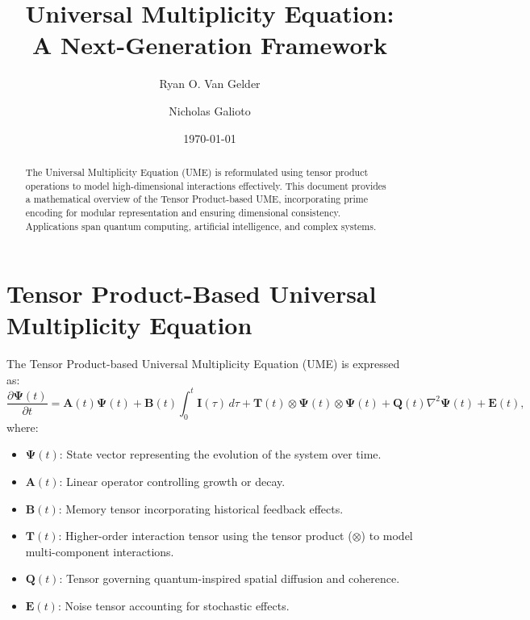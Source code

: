 \documentclass{article}
\theoremstyle{plain}
\begin{document}
\title{Universal Multiplicity Equation: \\ A Next-Generation Framework}

\author{Ryan O. Van Gelder}
\author{Nicholas Galioto}
\date{\today}

\maketitle
\begin{abstract}
The Universal Multiplicity Equation (UME) is reformulated using tensor product operations to model high-dimensional interactions effectively. This document provides a mathematical overview of the Tensor Product-based UME, incorporating prime encoding for modular representation and ensuring dimensional consistency. Applications span quantum computing, artificial intelligence, and complex systems.
\end{abstract}

\section{Tensor Product-Based Universal Multiplicity Equation}
The Tensor Product-based Universal Multiplicity Equation (UME) is expressed as:
\begin{equation}
\frac{\partial \bm{\Psi}(t)}{\partial t} = \bm{A}(t) \bm{\Psi}(t) + \bm{B}(t) \int_0^t \bm{I}(\tau) \, d\tau + \bm{T}(t) \otimes \bm{\Psi}(t) \otimes \bm{\Psi}(t) + \bm{Q}(t) \nabla^2 \bm{\Psi}(t) + \bm{E}(t),
\end{equation}
where:
\begin{itemize}
    \item \(\bm{\Psi}(t)\): State vector representing the evolution of the system over time.
    \item \(\bm{A}(t)\): Linear operator controlling growth or decay.
    \item \(\bm{B}(t)\): Memory tensor incorporating historical feedback effects.
    \item \(\bm{T}(t)\): Higher-order interaction tensor using the tensor product (\(\otimes\)) to model multi-component interactions.
    \item \(\bm{Q}(t)\): Tensor governing quantum-inspired spatial diffusion and coherence.
    \item \(\bm{E}(t)\): Noise tensor accounting for stochastic effects.
\end{itemize}
\end{document}
